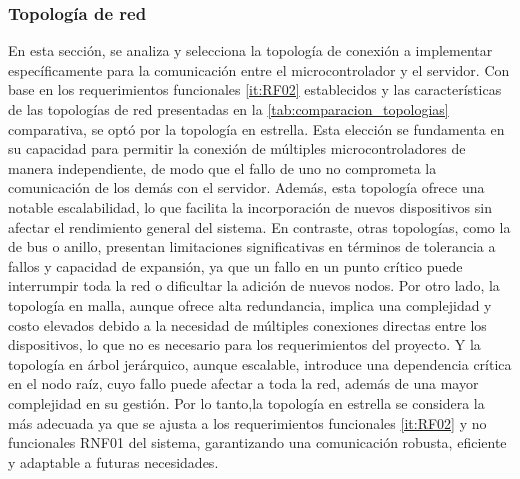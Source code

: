 \subsubsection{Topología de red}
En esta sección, se analiza y selecciona la topología de conexión a implementar 
específicamente para la comunicación entre el microcontrolador y el
servidor. Con base en los requerimientos funcionales \ref{it:RF02} establecidos y las 
características de las topologías de red presentadas en la \cref{tab:comparacion_topologias} comparativa, se
optó por la topología en estrella. Esta elección se fundamenta en su 
capacidad para permitir la conexión de múltiples microcontroladores de manera
independiente, de modo que el fallo de uno no comprometa la comunicación
de los demás con el servidor. Además, esta topología ofrece una notable 
escalabilidad, lo que facilita la incorporación de nuevos dispositivos sin afectar
el rendimiento general del sistema. 
\newline 
En contraste, otras topologías, como la
de bus o anillo, presentan limitaciones significativas en términos de tolerancia
a fallos y capacidad de expansión, ya que un fallo en un punto crítico puede
interrumpir toda la red o dificultar la adición de nuevos nodos. 
Por otro lado, la topología en malla, aunque ofrece alta redundancia,
implica una complejidad y costo elevados debido a la necesidad de múltiples conexiones
directas entre los dispositivos, lo que no es necesario para los requerimientos del proyecto.
Y la topología en árbol jerárquico, aunque escalable, introduce una dependencia crítica
en el nodo raíz, cuyo fallo puede afectar a toda la red, además de una mayor complejidad
en su gestión.
\newline 
Por lo tanto,la topología en estrella se considera la más adecuada ya que se ajusta a los 
requerimientos funcionales \ref{it:RF02} y no funcionales RNF01 del sistema, garantizando una comunicación robusta, eficiente
y adaptable a futuras necesidades.

\begingroup
\setlength{\tabcolsep}{3pt} 
\renewcommand{\arraystretch}{1.3} 
\scriptsize


